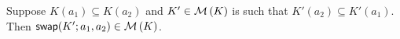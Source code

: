 \begin{lemma}
    \label{tourn_result_chainmin_mon_swapping}
    Suppose $K(a_1) \subseteq K(a_2)$ and $K' \in \operatorname{\mathcal{M}}\left({K}\right)$ is such that
    $K'(a_2) \subseteq K'(a_1)$. Then $\mathsf{swap}({K'}; {a_1}, {a_2}) \in \operatorname{\mathcal{M}}\left({K}\right)$.
\end{lemma}

\def\xset{(-1, 0) circle (1cm)}
\def\yset{(1, 0) circle (1cm)}
\def\xprimeset{(0, 1) circle (1cm)}
\def\yprimeset{(0, -1) circle (1cm)}
\newcommand{\setboundaries}{
    \draw \xset node {$X$};
    \draw \yset node {$Y$};
    \draw \xprimeset node {$X'$};
    \draw \yprimeset node {$Y'$};
}
\newcommand{\thiswithoutthose}[2]{
    \begin{scope}[even odd rule]
        \clip #2 (-2, -2) rectangle (2, 2);
        \fill[orange!60] #1;
    \end{scope}
}

